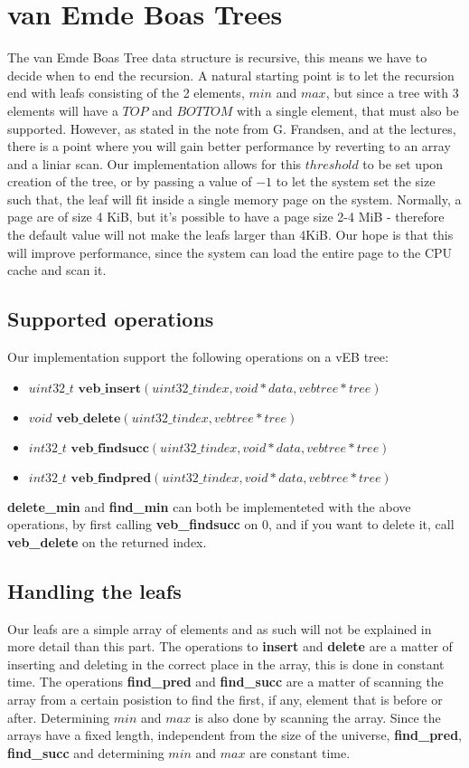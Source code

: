 \section*{van Emde Boas Trees}
The van Emde Boas Tree data structure is recursive, this means we have to decide when to end the recursion. A natural starting point is to let the recursion end with leafs consisting of the 2 elements, $min$ and $max$, but since a tree with 3 elements will have a $TOP$ and $BOTTOM$ with a single element, that must also be supported. However, as stated in the note from G. Frandsen, and at the lectures, there is a point where you will gain better performance by reverting to an array and a liniar scan. Our implementation allows for this $threshold$ to be set upon creation of the tree, or by passing a value of $-1$ to let the system set the size such that, the leaf will fit inside a single memory page on the system. Normally, a page are of size 4 KiB, but it's possible to have a page size 2-4 MiB - therefore the default value will not make the leafs larger than 4KiB. Our hope is that this will improve performance, since the system can load the entire page to the CPU cache and scan it.

\subsection*{Supported operations}
Our implementation support the following operations on a vEB tree:

\begin{itemize}
\item $uint32\_t \textbf{ veb\_insert}(uint32\_t index, void * data, vebtree * tree)$
\item $void \textbf{ veb\_delete}(uint32\_t index, vebtree * tree)$
\item $int32\_t \textbf{ veb\_findsucc}(uint32\_t index, void * data, vebtree *tree)$
\item $int32\_t \textbf{ veb\_findpred}(uint32\_t index, void * data, vebtree *tree)$
\end{itemize}

\textbf{delete\_min} and \textbf{find\_min} can both be implementeted with the above operations, by first calling \textbf{veb\_findsucc} on $0$, and if you want to delete it, call \textbf{veb\_delete} on the returned index.


\subsection*{Handling the leafs}
Our leafs are a simple array of elements and as such will not be explained in more detail than this part. The operations to \textbf{insert} and \textbf{delete} are a matter of inserting and deleting in the correct place in the array, this is done in constant time. The operations \textbf{find\_pred} and \textbf{find\_succ} are a matter of scanning the array from a certain posistion to find the first, if any, element that is before or after. Determining $min$ and $max$ is also done by scanning the array. Since the arrays have a fixed length, independent from the size of the universe, \textbf{find\_pred}, \textbf{find\_succ} and determining $min$ and $max$ are constant time.

